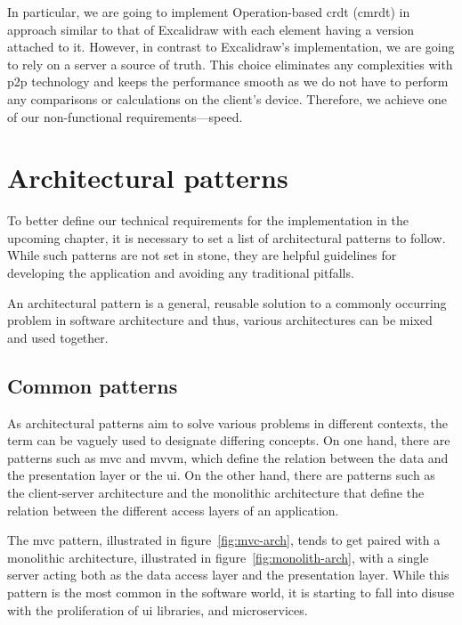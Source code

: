 \begin{toexclude}
  In particular, we are going to implement Operation-based \acrshort{crdt} (\acrshort{cmrdt}) in approach similar to that of Excalidraw with each element having a version attached to it.
  However, in contrast to Excalidraw's implementation, we are going to rely on a server a source of truth.
  This choice eliminates any complexities with \acrshort{p2p} technology and keeps the performance smooth as we do not have to perform any comparisons or calculations on the client's device. Therefore, we achieve one of our non-functional requirements---speed.

  \section{Architectural patterns}

  To better define our technical requirements for the implementation in the upcoming chapter, it is necessary to set a list of architectural patterns to follow.
  While such patterns are not set in stone, they are helpful guidelines for developing the application and avoiding any traditional pitfalls.

  An architectural pattern is a general, reusable solution to a commonly occurring problem in software architecture and thus, various architectures can be mixed and used together.

  \subsection{Common patterns}

  As architectural patterns aim to solve various problems in different contexts, the term can be vaguely used to designate differing concepts.
  On one hand, there are patterns such as \acrfull{mvc} and \acrfull{mvvm}, which define the relation between the data and the presentation layer or the \acrfull{ui}.
  On the other hand, there are patterns such as the client-server architecture and the monolithic architecture that define the relation between the different access layers of an application.

  The \acrshort{mvc} pattern, illustrated in figure~\ref{fig:mvc-arch}, tends to get paired with a monolithic architecture, illustrated in figure~\ref{fig:monolith-arch}, with a single server acting both as the data access layer and the presentation layer.
  While this pattern is the most common in the software world, it is starting to fall into disuse with the proliferation of \acrshort{ui} libraries, and microservices.


\end{toexclude}
